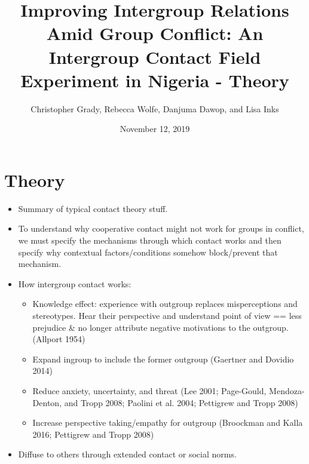 \documentclass[11pt]{article}
\title{Improving Intergroup Relations Amid Group Conflict: An Intergroup
Contact Field Experiment in Nigeria - Theory}
\author{
Christopher Grady, Rebecca Wolfe, Danjuma Dawop, and Lisa Inks
}
\date{November 12, 2019}
\providecommand{\tightlist}{%
  \setlength{\itemsep}{0pt}\setlength{\parskip}{0pt}}
\begin{document}
\VerbatimFootnotes

%
%
%
%
%
%
%
%
%
%

\maketitle

\hypertarget{theory}{%
\section{Theory}\label{theory}}

\begin{itemize}
\item
  Summary of typical contact theory stuff.
\item
  To understand why cooperative contact might not work for groups in
  conflict, we must specify the mechanisms through which contact works
  and then specify why contextual factors/conditions somehow
  block/prevent that mechanism.
\item
  How intergroup contact works:

  \begin{itemize}
  \tightlist
  \item
    Knowledge effect: experience with outgroup replaces misperceptions
    and stereotypes. Hear their perspective and understand point of view
    == less prejudice \& no longer attribute negative motivations to the
    outgroup. (Allport 1954)
  \item
    Expand ingroup to include the former outgroup (Gaertner and Dovidio
    2014)
  \item
    Reduce anxiety, uncertainty, and threat (Lee 2001; Page-Gould,
    Mendoza-Denton, and Tropp 2008; Paolini et al. 2004; Pettigrew and
    Tropp 2008)
  \item
    Increase perspective taking/empathy for outgroup (Broockman and
    Kalla 2016; Pettigrew and Tropp 2008)
  \end{itemize}
\item
  Diffuse to others through extended contact or social norms.
\end{itemize}
\end{document}
